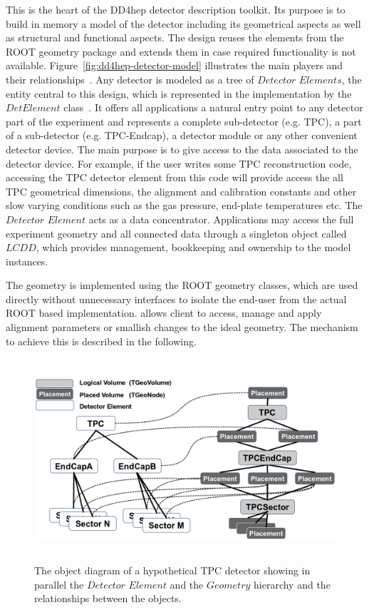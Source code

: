 \documentclass[10pt,a4paper]{article}
\begin{document}
\noindent
This is the heart of the DD4hep detector description toolkit. Its purpose is 
to build in memory a model of the detector including its geometrical aspects
as well as structural and functional aspects. The design reuses the elements 
from the ROOT geometry package and extends them in case required functionality 
is not available. Figure~\ref{fig:dd4hep-detector-model} illustrates the main
players and their relationships~\cite{bib:DD4hep}.
Any detector is modeled as a tree of $Detector$ $Elements$, the entity 
central to this design, which is represented in the implementation by 
the $DetElement$ class~\cite{bib:LHCb-geometry}. It offers all
applications a natural entry point to any detector part of the experiment
and represents a complete sub-detector (e.g. TPC), a part of a 
sub-detector (e.g. TPC-Endcap), a detector module or any other convenient 
detector device. 
The main purpose is to give access to the data associated 
to the detector device. For example, if the user writes some TPC reconstruction 
code, accessing the TPC detector element from this code will provide access 
the all TPC geometrical dimensions, the alignment and calibration constants 
and other slow varying conditions such as the gas pressure, end-plate 
temperatures etc. The $Detector$ $Element$ acts as a data concentrator. 
Applications may access the full experiment geometry and all connected data
through a singleton object called $LCDD$, which provides 
management, bookkeeping and ownership to the model instances.

\noindent
The geometry is implemented using the ROOT geometry classes, which are used
directly without unnecessary interfaces to isolate the end-user from the 
actual ROOT based implementation.
\DDA allows client to access, manage and apply alignment parameters or 
smallish changes to the ideal geometry. The mechanism to achieve this 
is described in the following.


\begin{figure}[h]
  \begin{center}
    \includegraphics[height=75mm] {DD4hep_detelement_tree}
    \caption{The object diagram of a hypothetical TPC detector showing in
    parallel the $Detector$ $Element$ and the $Geometry$ hierarchy and the 
    relationships between the objects.}
    \label{fig:dd4hep-hierarchies}
  \end{center}
  \vspace{-0.5cm}
\end{figure}
\end{document}
